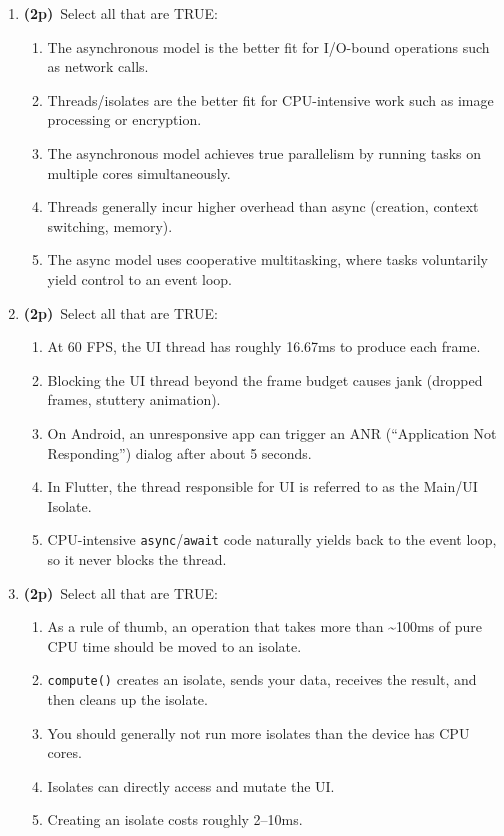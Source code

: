 \documentclass[11pt]{article}
\newcommand{\pts}{\textbf{(2p)}~}
\begin{document}
\begin{enumerate}
    \item \pts Select all that are TRUE:
    \begin{enumerate}
      \item The asynchronous model is the better fit for I/O-bound operations such as network calls.
      \item Threads/isolates are the better fit for CPU-intensive work such as image processing or encryption.
      \item The asynchronous model achieves true parallelism by running tasks on multiple cores simultaneously.
      \item Threads generally incur higher overhead than async (creation, context switching, memory).
      \item The async model uses cooperative multitasking, where tasks voluntarily yield control to an event loop.
    \end{enumerate}

    \item \pts Select all that are TRUE:
    \begin{enumerate}
      \item At 60 FPS, the UI thread has roughly 16.67ms to produce each frame.
      \item Blocking the UI thread beyond the frame budget causes jank (dropped frames, stuttery animation).
      \item On Android, an unresponsive app can trigger an ANR (``Application Not Responding'') dialog after about 5 seconds.
      \item In Flutter, the thread responsible for UI is referred to as the Main/UI Isolate.
      \item CPU-intensive \texttt{async}/\texttt{await} code naturally yields back to the event loop, so it never blocks the thread.
    \end{enumerate}

    \item \pts Select all that are TRUE:
    \begin{enumerate}
      \item As a rule of thumb, an operation that takes more than \textasciitilde100ms of pure CPU time should be moved to an isolate.
      \item \texttt{compute()} creates an isolate, sends your data, receives the result, and then cleans up the isolate.
      \item You should generally not run more isolates than the device has CPU cores.
      \item Isolates can directly access and mutate the UI.
      \item Creating an isolate costs roughly 2--10ms.
    \end{enumerate}


\end{enumerate}
\end{document}
